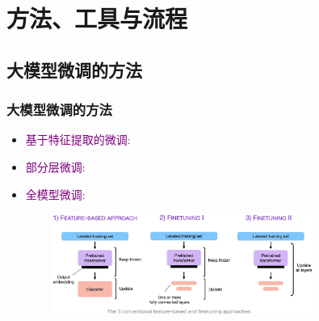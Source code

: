 \section{方法、工具与流程}
\subsection{大模型微调的方法}
\begin{frame}
    \frametitle{大模型微调的方法}
    \begin{itemize}
	    \item \textcolor{purple}{基于特征提取的微调:}\\
		    {\fontsize{7.2pt}{6.2pt}\selectfont{冻结预训练模型大部分层，仅训练新添加分类器或回归层，适用于数据量小、任务与预训练任务相关性高的场景，如图像分类任务}}
	    \item \textcolor{purple}{部分层微调:}\\
		    {\fontsize{7.2pt}{6.2pt}\selectfont{选择预训练模型部分层进行微调，平衡训练成本和模型性能，如文本摘要任务}}
	    \item \textcolor{purple}{全模型微调:}\\
		    {\fontsize{7.2pt}{6.2pt}\selectfont{对预训练模型所有参数进行微调，适用于数据量充足、任务与预训练任务差异大的场景，如情感分析任务}}
    \end{itemize}
\begin{figure}[h!]
\vspace*{-0.10in}
\centering
\includegraphics[height=1.3in, width=3.7in, viewport=0 40 1400 544,clip]{Figures/Three_conventional_approaches_fine-tuning_LLM.jpeg}
\label{LLM_model-fine_tuning}
\end{figure}
\end{frame}

